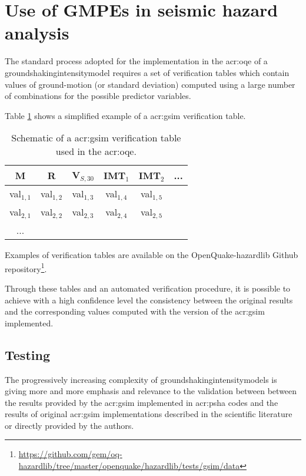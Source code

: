 %
\section{Use of GMPEs in seismic hazard analysis}
% 
The standard process adopted for the implementation in the \gls{acr:oqe} 
of a \gls{groundshakingintensitymodel} requires a 
set of verification tables which contain values of ground-motion (or standard 
deviation) computed using a large number of combinations for the possible 
predictor variables. 

Table \ref{tab:verification} shows a simplified example of a \gls{acr:gsim} 
verification table.
\begin{table}[!hb]
\centering
\begin{tabular}{|cccccc|}
\hline
\rowcolor{anti-flashwhite}
M & R & V$_{S,30}$ & IMT$_1$ & IMT$_2$ & ... \\
\hline 
val$_{1,1}$ & val$_{1,2}$ & val$_{1,3}$ & val$_{1,4}$ & val$_{1,5}$ & \\
val$_{2,1}$ & val$_{2,2}$ & val$_{2,3}$ & val$_{2,4}$ & val$_{2,5}$ & \\
... & & & & & \\
\hline
\end{tabular}
\caption{Schematic of a \gls{acr:gsim} verification table used in the 
\gls{acr:oqe}.}
\label{tab:verification}
\end{table}
Examples of verification tables are available on the OpenQuake-hazardlib Github
repository\footnote{
\href{https://github.com/gem/oq-hazardlib/tree/master/openquake/hazardlib/tests/gsim/data}{
https://github.com/gem/oq-hazardlib/tree/master/openquake/hazardlib/tests/gsim/data}
}.

Through these tables and an automated verification procedure, it is 
possible to achieve with a high confidence level the consistency between 
the original results and the corresponding values computed with the 
version of the \gls{acr:gsim} implemented.
%
\subsection{Testing}
%
The progressively increasing complexity of 
\glspl{groundshakingintensitymodel}
is giving more and more emphasis and relevance to the validation between 
between the results provided by the \gls{acr:gsim} implemented in
\gls{acr:psha} codes and the results of original \gls{acr:gsim} 
implementations described in the scientific literature or directly 
provided by the authors.

